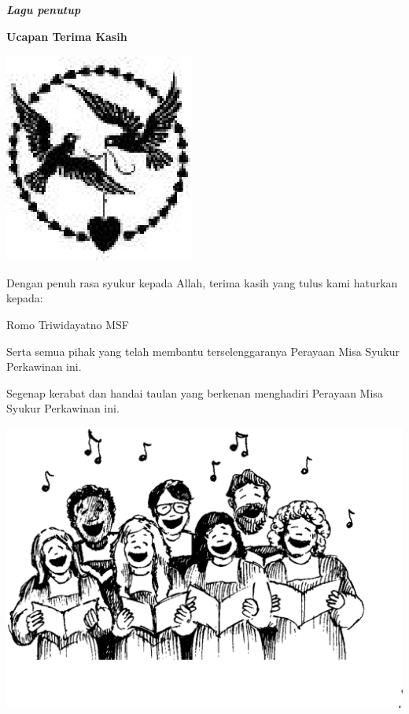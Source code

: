 \documentclass[a5paper,headsepline,titlepage,10pt,normalheadings,DIVcalc]{scrbook}
\makeatletter
\newcommand{\judul}[1]{%
  {\parindent \z@ \centering \normalfont
    \interlinepenalty\@M \Large \bfseries #1\par\nobreak \vskip 20\p@ }}
\newcommand{\lagu}[1]{%
  {\parindent \z@ \normalfont
    \interlinepenalty\@M \bfseries \emph{#1}\par\nobreak \vskip 20\p@ }}
\newcommand{\romo}{Triwidayatno MSF }
\makeatother
\begin{document}
\lagu{Lagu penutup}
\newpage
\thispagestyle{empty}
\judul{Ucapan Terima Kasih}
\begin{center}
\includegraphics[scale=1]{images}

Dengan penuh rasa syukur kepada Allah, terima kasih yang tulus kami haturkan kepada:

Romo \romo \vspace{0.5cm}


Serta semua pihak yang telah membantu terselenggaranya Perayaan Misa Syukur Perkawinan ini.\vspace{0.5cm}

Segenap kerabat dan handai taulan yang berkenan menghadiri Perayaan Misa Syukur Perkawinan ini. \vspace{0.5cm}

\includegraphics[scale=0.2]{choir01}
\end{center}
\end{document}
